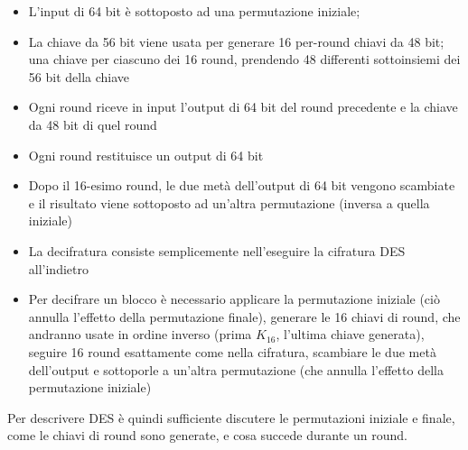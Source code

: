\begin{itemize}
  \item L'input di 64 bit è sottoposto ad una permutazione iniziale;
  \item La chiave da 56 bit viene usata per generare 16 per-round chiavi da 48 bit; una chiave per ciascuno dei 16 round, prendendo 48 differenti sottoinsiemi dei 56 bit della chiave
  \item Ogni round riceve in input l'output di 64 bit del round precedente e la chiave da 48 bit di quel round
  \item Ogni round restituisce un output di 64 bit
  \item Dopo il 16-esimo round, le due metà dell'output di 64 bit vengono scambiate e il risultato viene sottoposto ad un’altra permutazione (inversa a quella iniziale)
  \item La decifratura consiste semplicemente nell’eseguire la cifratura DES all’indietro
  \item Per decifrare un blocco è necessario applicare la permutazione iniziale (ciò annulla l’effetto della permutazione finale), generare le 16 chiavi di round, che andranno usate in ordine inverso (prima $K_{16}$, l'ultima chiave generata), seguire 16 round esattamente come nella cifratura, scambiare le due metà dell'output e sottoporle a un'altra permutazione (che annulla l'effetto della permutazione iniziale)
\end{itemize}
Per descrivere DES è quindi sufficiente discutere le permutazioni iniziale e finale, come le chiavi di round sono generate, e cosa succede durante un round.



